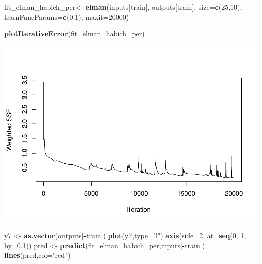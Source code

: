 \documentclass[
]{book}
\newenvironment{Shaded}{\begin{snugshade}}{\end{snugshade}}
\newcommand{\AttributeTok}[1]{\textcolor[rgb]{0.13,0.29,0.53}{#1}}
\newcommand{\DecValTok}[1]{\textcolor[rgb]{0.00,0.00,0.81}{#1}}
\newcommand{\FloatTok}[1]{\textcolor[rgb]{0.00,0.00,0.81}{#1}}
\newcommand{\FunctionTok}[1]{\textcolor[rgb]{0.13,0.29,0.53}{\textbf{#1}}}
\newcommand{\NormalTok}[1]{#1}
\newcommand{\OtherTok}[1]{\textcolor[rgb]{0.56,0.35,0.01}{#1}}
\newcommand{\SpecialCharTok}[1]{\textcolor[rgb]{0.81,0.36,0.00}{\textbf{#1}}}
\newcommand{\StringTok}[1]{\textcolor[rgb]{0.31,0.60,0.02}{#1}}
\begin{document}
\begin{Shaded}
\begin{Highlighting}[]
\NormalTok{fit\_elman\_habich\_per}\OtherTok{\textless{}{-}} \FunctionTok{elman}\NormalTok{(inputs[train],}
\NormalTok{                       outputs[train],}
                       \AttributeTok{size=}\FunctionTok{c}\NormalTok{(}\DecValTok{25}\NormalTok{,}\DecValTok{10}\NormalTok{),}
                       \AttributeTok{learnFuncParams=}\FunctionTok{c}\NormalTok{(}\FloatTok{0.1}\NormalTok{),}
                       \AttributeTok{maxit=}\DecValTok{20000}\NormalTok{)}


\FunctionTok{plotIterativeError}\NormalTok{(fit\_elman\_habich\_per)}
\end{Highlighting}
\end{Shaded}

\includegraphics{bookdown-demo_files/figure-latex/unnamed-chunk-200-1.pdf}

\begin{Shaded}
\begin{Highlighting}[]
\NormalTok{y7 }\OtherTok{\textless{}{-}} \FunctionTok{as.vector}\NormalTok{(outputs[}\SpecialCharTok{{-}}\NormalTok{train])}
\FunctionTok{plot}\NormalTok{(y7,}\AttributeTok{type=}\StringTok{"l"}\NormalTok{)}
\FunctionTok{axis}\NormalTok{(}\AttributeTok{side=}\DecValTok{2}\NormalTok{, }\AttributeTok{at=}\FunctionTok{seq}\NormalTok{(}\DecValTok{0}\NormalTok{, }\DecValTok{1}\NormalTok{, }\AttributeTok{by=}\FloatTok{0.1}\NormalTok{))}
\NormalTok{pred }\OtherTok{\textless{}{-}} \FunctionTok{predict}\NormalTok{(fit\_elman\_habich\_per,inputs[}\SpecialCharTok{{-}}\NormalTok{train])}
\FunctionTok{lines}\NormalTok{(pred,}\AttributeTok{col=}\StringTok{"red"}\NormalTok{)}
\end{Highlighting}
\end{Shaded}
\end{document}
